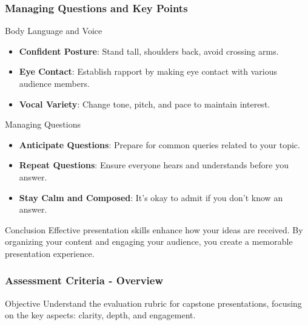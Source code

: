 \documentclass[aspectratio=169]{beamer}
\begin{document}
\begin{frame}[fragile]
    \frametitle{Managing Questions and Key Points}
    \begin{block}{Body Language and Voice}
        \begin{itemize}
            \item \textbf{Confident Posture}: Stand tall, shoulders back, avoid crossing arms.
            \item \textbf{Eye Contact}: Establish rapport by making eye contact with various audience members.
            \item \textbf{Vocal Variety}: Change tone, pitch, and pace to maintain interest.
        \end{itemize}
    \end{block}

    \begin{block}{Managing Questions}
        \begin{itemize}
            \item \textbf{Anticipate Questions}: Prepare for common queries related to your topic.
            \item \textbf{Repeat Questions}: Ensure everyone hears and understands before you answer.
            \item \textbf{Stay Calm and Composed}: It's okay to admit if you don't know an answer.
        \end{itemize}
    \end{block}

    \begin{block}{Conclusion}
        Effective presentation skills enhance how your ideas are received. By organizing your content and engaging your audience, you create a memorable presentation experience.
    \end{block}
\end{frame}

\begin{frame}[fragile]
    \frametitle{Assessment Criteria - Overview}
    \begin{block}{Objective}
        Understand the evaluation rubric for capstone presentations, focusing on the key aspects: clarity, depth, and engagement.
    \end{block}
\end{frame}
\end{document}
